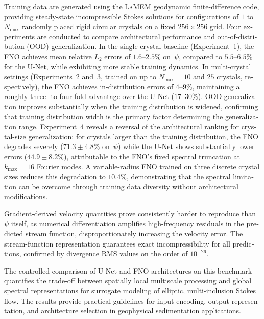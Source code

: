 \begin{otherlanguage}{english}
Training data are generated using the \textsc{LaMEM} geodynamic finite-difference
code, providing steady-state incompressible Stokes solutions for configurations
of $1$ to $N_{\max}$ randomly placed rigid circular crystals on a fixed
$256 \times 256$ grid. Four experiments are conducted to compare architectural
performance and out-of-distribution (OOD) generalization. In the single-crystal
baseline (Experiment~1), the FNO achieves mean relative $L_2$ errors of
$1.6$--$2.5\%$ on~$\psi$, compared to $5.5$--$6.5\%$ for the U-Net, while
exhibiting more stable training dynamics. In multi-crystal settings
(Experiments~2 and~3, trained on up to $N_{\max} = 10$ and $25$ crystals,
respectively), the FNO achieves in-distribution errors of $4$--$9\%$,
maintaining a roughly three- to four-fold advantage over the U-Net ($17$--$30\%$). OOD
generalization improves substantially when the training distribution is widened,
confirming that training distribution width is the primary factor determining
the generalization range. Experiment~4 reveals a reversal of the architectural
ranking for crystal-size generalization: for crystals larger than the training
distribution, the FNO degrades severely ($71.3 \pm 4.8\%$ on~$\psi$) while the
U-Net shows substantially lower errors ($44.9 \pm 8.2\%$), attributable to the
FNO's fixed spectral truncation at $k_{\max} = 16$ Fourier modes. A
variable-radius FNO trained on three discrete crystal sizes reduces this
degradation to $10.4\%$, demonstrating that the spectral limitation can be
overcome through training data diversity without architectural modifications.

Gradient-derived velocity quantities prove consistently harder to
reproduce than $\psi$ itself, as numerical differentiation amplifies
high-frequency residuals in the predicted stream function, disproportionately
increasing the velocity error. The stream-function representation guarantees
exact incompressibility for all predictions, confirmed by divergence RMS values
on the order of $10^{-26}$.

The controlled comparison of U-Net and FNO architectures on this benchmark
quantifies the trade-off between spatially local multiscale processing and global
spectral representations for surrogate modeling of elliptic, multi-inclusion
Stokes flow. The results provide practical guidelines for input encoding, output
representation, and architecture selection in geophysical sedimentation
applications.
\end{otherlanguage}
